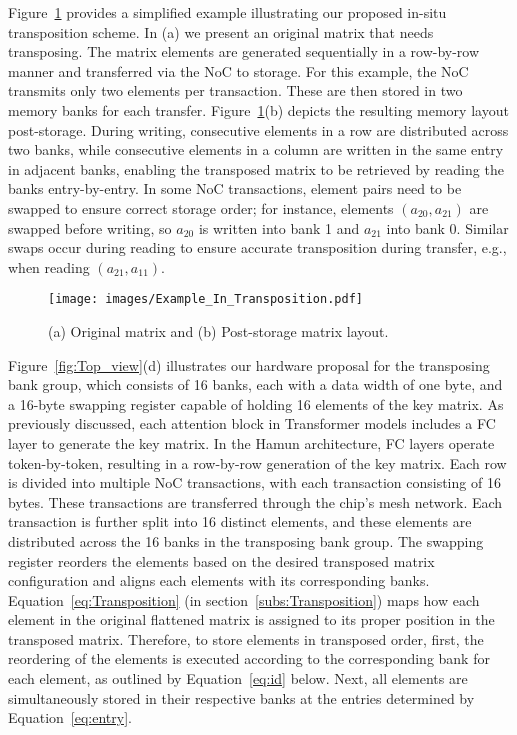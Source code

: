 Figure~\ref{fig:Example_In_Transposition} provides a simplified example illustrating our proposed in-situ transposition scheme. In (a) we present an original matrix that needs transposing. The matrix elements are generated sequentially in a row-by-row manner and transferred via the NoC to storage. For this example, the NoC transmits only two elements per transaction. These are then stored in two memory banks for each transfer. Figure~\ref{fig:Example_In_Transposition}(b) depicts the resulting memory layout post-storage. During writing, consecutive elements in a row are distributed across two banks, while consecutive elements in a column are written in the same entry in adjacent banks, enabling the transposed matrix to be retrieved by reading the banks entry-by-entry. In some NoC transactions, element pairs need to be swapped to ensure correct storage order; for instance, elements $(a_{20}, a_{21})$ are swapped before writing, so $a_{20}$ is written into bank 1 and $a_{21}$ into bank 0. Similar swaps occur during reading to ensure accurate transposition during transfer, e.g., when reading $(a_{21}, a_{11})$.

\begin{figure}[t!]
    \centering
    \texttt{[image: images/Example\_In\_Transposition.pdf]}
    \vskip -0.10in
    \caption{(a) Original matrix and (b) Post-storage matrix layout.}
    \vskip -0.25in
    \label{fig:Example_In_Transposition}
\end{figure}

Figure~\ref{fig:Top_view}(d) illustrates our hardware proposal for the transposing bank group, which consists of 16 banks, each with a data width of one byte, and a 16-byte swapping register capable of holding 16 elements of the key matrix. As previously discussed, each attention block in Transformer models includes a FC layer to generate the key matrix. In the Hamun architecture, FC layers operate token-by-token, resulting in a row-by-row generation of the key matrix. Each row is divided into multiple NoC transactions, with each transaction consisting of 16 bytes. These transactions are transferred through the chip's mesh network. Each transaction is further split into 16 distinct elements, and these elements are distributed across the 16 banks in the transposing bank group. The swapping register reorders the elements based on the desired transposed matrix configuration and aligns each elements with its corresponding banks. Equation~\ref{eq:Transposition} (in section~\ref{subs:Transposition}) maps how each element in the original flattened matrix is assigned to its proper position in the transposed matrix. Therefore, to store elements in transposed order, first, the reordering of the elements is executed according to the corresponding bank for each element, as outlined by Equation~\ref{eq:id} below. Next, all elements are simultaneously stored in their respective banks at the entries determined by Equation~\ref{eq:entry}.

